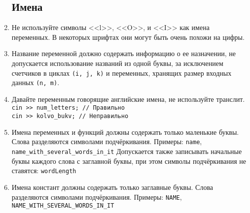 \documentclass[11pt,a4paper,oneside]{article}
\begin{document}
\begin{enumerate}
\subsection*{Имена}

     \item Не используйте символы <<l>>, <<O>>, и <<I>> как имена переменных. 
           В некоторых шрифтах они могут быть очень похожи на цифры.
     \item Название переменной должно содержать информацию о ее назначении, 
            не допускается использование названий из одной буквы, за исключением счетчиков в циклах
            \texttt{(i, j, k)} и переменных, хранящих размер входных данных \texttt{(n, m)}.
     \item Давайте переменным говорящие английские имена, не используйте транслит.
           \\ \texttt{cin >> num\_letters; // Правильно}
           \\ \texttt{cin >> kolvo\_bukv; \quad // Неправильно}
     \item Имена переменных и функций должны содержать только маленькие буквы. Слова
           разделяются символами подчёркивания. Примеры:
           \texttt{name}, \texttt{name\_with\_several\_words\_in\_it}
           Допускается также записывать начальные буквы каждого слова с заглавной буквы,
           при этом символы подчёркивания не ставятся: \texttt{wordLength}  
     \item Имена констант должны содержать только заглавные буквы. Слова разделяются
           символами подчёркивания. Примеры: \texttt{NAME}, \texttt{NAME\_WITH\_SEVERAL\_WORDS\_IN\_IT}


\end{enumerate}
\end{document}
